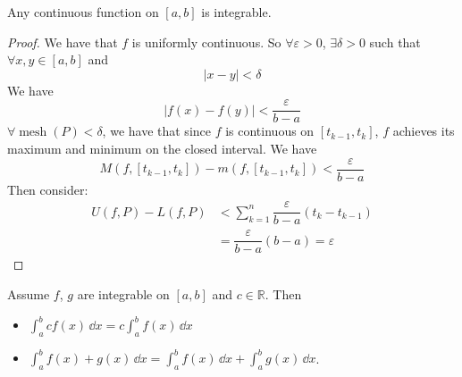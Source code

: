 \documentclass{report}
\begin{document}
\begin{theorem}{33.2}
    Any continuous function on $[a,b]$ is integrable.
\end{theorem}
    \begin{proof}
        We have that $f$ is uniformly continuous. So $\forall \varepsilon>  0$, $\exists \delta > 0$ such that $\forall x, y \in  [ a, b]$ and 
            \begin{equation*}
                \lvert x - y \rvert <   \delta
            \end{equation*}
        We have
            \begin{equation*}
                 \lvert f(x) - f(y) \rvert < \dfrac{ \varepsilon}{ b - a}
            \end{equation*}
        $\forall \mathop{mesh}(P) < \delta$, we have that since $f$ is continuous on $[t_{k - 1}, t_{k}]$, $f$ achieves its maximum and minimum on the closed interval. We have
            \begin{equation*}
                M(f, [t_{k - 1}, t_{k}]) - m(f, [t_{k - 1}, t_{k}]) < \dfrac{ \varepsilon}{ b - a}
            \end{equation*}
        Then consider:
            \begin{align*}
                U(f, P) - L(f, P) &< \sum_{ k = 1}^{n}\dfrac{\varepsilon}{ b - a} (t_{k} - t_{k - 1}) \\
                                  &= \dfrac{\varepsilon}{ b - a}(b - a) = \varepsilon
            \end{align*}
    \end{proof}

\begin{theorem}{33.3}
    Assume $f$, $g$ are integrable on $[a, b]$ and $c \in \mathbb{ R}$. Then 
        \begin{itemize}
            \item  $\int_{a}^{b} cf(x) \, \dd{x}  = c\int_{a}^{b} f(x) \, \dd{x} $

            \item  $\int_{a}^{b} f(x) + g(x) \, \dd{x}  = \int_{a}^{b} f(x) \, \dd{x}  + \int_{a}^{b} g(x) \, \dd{x} $. 
        \end{itemize}
\end{theorem}
\end{document}
